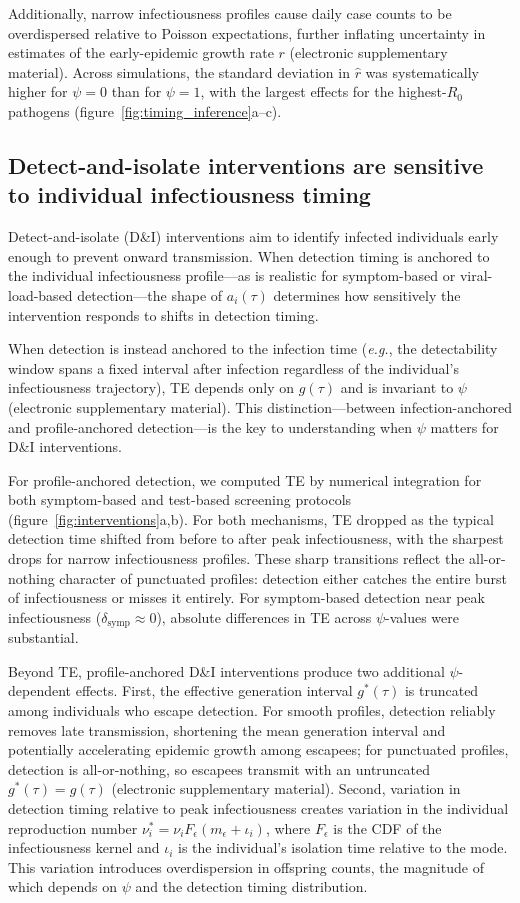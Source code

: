 \documentclass[10pt]{article}
\makeatletter
\newcommand{\eg}{\textit{e.g.}\@\xspace}
\makeatother
\begin{document}
Additionally, narrow infectiousness profiles cause daily case counts to be overdispersed relative to Poisson expectations, further inflating uncertainty in estimates of the early-epidemic growth rate $r$ (electronic supplementary material). Across simulations, the standard deviation in $\hat{r}$ was systematically higher for $\psi = 0$ than for $\psi = 1$, with the largest effects for the highest-$R_0$ pathogens (figure~\ref{fig:timing_inference}a--c).

\subsection{Detect-and-isolate interventions are sensitive to individual infectiousness timing}

Detect-and-isolate (D\&I) interventions aim to identify infected individuals early enough to prevent onward transmission. When detection timing is anchored to the individual infectiousness profile---as is realistic for symptom-based or viral-load-based detection---the shape of $a_i(\tau)$ determines how sensitively the intervention responds to shifts in detection timing.

When detection is instead anchored to the infection time (\eg, the detectability window spans a fixed interval after infection regardless of the individual's infectiousness trajectory), TE depends only on $g(\tau)$ and is invariant to $\psi$ (electronic supplementary material). This distinction---between infection-anchored and profile-anchored detection---is the key to understanding when $\psi$ matters for D\&I interventions.

For profile-anchored detection, we computed TE by numerical integration for both symptom-based and test-based screening protocols (figure~\ref{fig:interventions}a,b). For both mechanisms, TE dropped as the typical detection time shifted from before to after peak infectiousness, with the sharpest drops for narrow infectiousness profiles. These sharp transitions reflect the all-or-nothing character of punctuated profiles: detection either catches the entire burst of infectiousness or misses it entirely. For symptom-based detection near peak infectiousness ($\delta_\text{symp} \approx 0$), absolute differences in TE across $\psi$-values were substantial.

Beyond TE, profile-anchored D\&I interventions produce two additional $\psi$-dependent effects. First, the effective generation interval $g^*(\tau)$ is truncated among individuals who escape detection. For smooth profiles, detection reliably removes late transmission, shortening the mean generation interval and potentially accelerating epidemic growth among escapees; for punctuated profiles, detection is all-or-nothing, so escapees transmit with an untruncated $g^*(\tau) = g(\tau)$ (electronic supplementary material). Second, variation in detection timing relative to peak infectiousness creates variation in the individual reproduction number $\nu_i^* = \nu_i F_\epsilon(m_\epsilon + \iota_i)$, where $F_\epsilon$ is the CDF of the infectiousness kernel and $\iota_i$ is the individual's isolation time relative to the mode. This variation introduces overdispersion in offspring counts, the magnitude of which depends on $\psi$ and the detection timing distribution.
\end{document}
